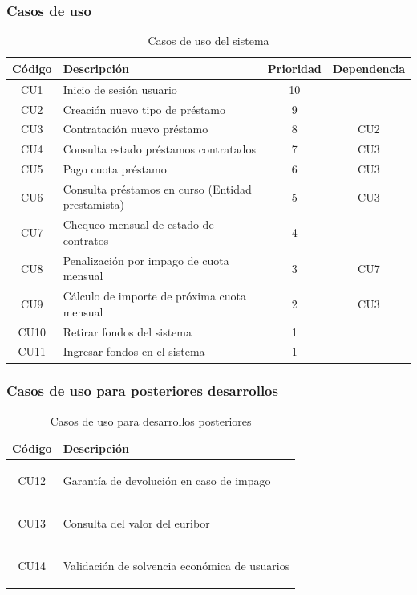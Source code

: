 \subsubsection{Casos de uso}
\begin{table}[H]
\centering
\caption{Casos de uso del sistema}
\label{tab:casos-uso-sistema}
\small
\begin{tabular}{|c|l|c|c|}
    \hline
    \rowcolor[HTML]{D0E7FF}
    Código  & Descripción   & Prioridad & Dependencia  \\ \hline
    CU1     & Inicio de sesión usuario        & 10   &   \\ \hline
    CU2     & Creación nuevo tipo de préstamo     & 9   &   \\ \hline
    CU3     & Contratación nuevo préstamo        & 8   &  CU2 \\ \hline
    CU4     & Consulta estado préstamos contratados        & 7   & CU3   \\ \hline
    CU5     & Pago cuota préstamo       & 6   & CU3 \\ \hline
    CU6     & Consulta préstamos en curso (Entidad prestamista)        & 5   & CU3 \\ \hline
    CU7     & Chequeo mensual de estado de contratos        & 4   &   \\ \hline
    CU8     & Penalización por impago de cuota mensual       & 3   &CU7   \\ \hline
    CU9     & Cálculo de importe de próxima cuota mensual         & 2   &  CU3  \\ \hline
    CU10     & Retirar fondos del sistema        & 1   &   \\ \hline
    CU11     & Ingresar fondos en el sistema        & 1   &   \\ \hline
\end{tabular}
\end{table}


\subsubsection{Casos de uso para posteriores desarrollos}


    \begin{table}[H]
    \centering
    \caption{Casos de uso para desarrollos posteriores}
    \label{tab:casos-uso-posteriores}
    \begin{tabular}{|c|l|}
        \hline
        \rowcolor[HTML]{D0E7FF}
    Código & Descripción \\ \hline
    \hypertarget{cu:garantia}{CU12}
        & Garantía de devolución en caso de impago \\ \hline
    \hypertarget{cu:euribor}{CU13}
        & Consulta del valor del \gls{euribor} \\ \hline
    \hypertarget{cu:solvencia}{CU14}
        & Validación de solvencia económica de usuarios \\ \hline
    \end{tabular}
    \end{table}

